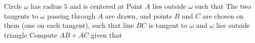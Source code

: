 Circle $\omega$ has radius $5$ and is centered at   Point $A$ lies outside $\omega$ such that   The two tangents to $\omega$ passing through $A$ are drawn, and points $B$ and $C$ are chosen on them (one on each tangent), such that line $BC$ is tangent to $\omega$ and $\omega$ lies outside triangle   Compute $AB+AC$ given that 